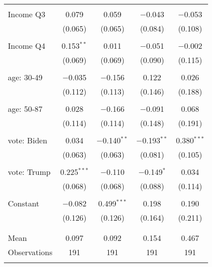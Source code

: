\begin{tabular}{@{\extracolsep{5pt}}lcccc}
  & & & & \\ 
 Income Q3 & 0.079 & 0.059 & $-$0.043 & $-$0.053 \\ 
  & (0.065) & (0.065) & (0.084) & (0.108) \\ 
  & & & & \\ 
 Income Q4 & 0.153$^{**}$ & 0.011 & $-$0.051 & $-$0.002 \\ 
  & (0.069) & (0.069) & (0.090) & (0.115) \\ 
  & & & & \\ 
 age: 30-49 & $-$0.035 & $-$0.156 & 0.122 & 0.026 \\ 
  & (0.112) & (0.113) & (0.146) & (0.188) \\ 
  & & & & \\ 
 age: 50-87 & 0.028 & $-$0.166 & $-$0.091 & 0.068 \\ 
  & (0.114) & (0.114) & (0.148) & (0.191) \\ 
  & & & & \\ 
 vote: Biden & 0.034 & $-$0.140$^{**}$ & $-$0.193$^{**}$ & 0.380$^{***}$ \\ 
  & (0.063) & (0.063) & (0.081) & (0.105) \\ 
  & & & & \\ 
 vote: Trump & 0.225$^{***}$ & $-$0.110 & $-$0.149$^{*}$ & 0.034 \\ 
  & (0.068) & (0.068) & (0.088) & (0.114) \\ 
  & & & & \\ 
 Constant & $-$0.082 & 0.499$^{***}$ & 0.198 & 0.190 \\ 
  & (0.126) & (0.126) & (0.164) & (0.211) \\ 
  & & & & \\ 
\hline \\[-1.8ex] 
Mean & 0.097 & 0.092 & 0.154 & 0.467 \\ 
Observations & 191 & 191 & 191 & 191 \\ 
\hline 
\hline \\[-1.8ex] 
\end{tabular} 
